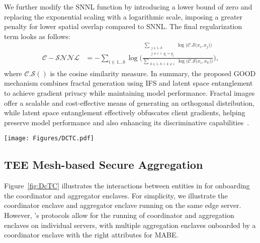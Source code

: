 We further modify the SNNL function by introducing a lower bound of zero and replacing the exponential scaling with a logarithmic scale, imposing a greater penalty for lower spatial overlap compared to SNNL. The final regularization term looks as follows:
\begin{align*}
\mathcal{C-SNNL} &  = -\sum\limits_{i \in 1...b } \log\Biggl( \frac{\sum\limits_{\substack{j \in 1..b \\ j \neq i \, \land \, y_{i} = y_{j}}} \log {\Big(\mathcal{C.S}\big(x_i, x_j\big)\Big)}}{\sum\limits_{\substack{k \in 1..b \, \land \, k \neq i }} \log {\Big(\mathcal{C.S}\big(x_i, x_k\big)\Big)}}\Biggl),
\end{align*}
where $\mathcal{C.S}()$ is the cosine similarity measure.
In summary, the proposed GOOD mechanism combines fractal generation using IFS and latent space entanglement to achieve gradient privacy while maintaining model performance. Fractal images offer a scalable and cost-effective means of generating an orthogonal distribution, while latent space entanglement effectively obfuscates client gradients, helping preserve model performance and also enhancing its discriminative capabilities~\cite{FroPapHin19}.





\begin{figure*}[!ht]
\centering
  \texttt{[image: Figures/DCTC.pdf]} 
  \vspace{-0.1in}
  \caption{The sequence diagram of \sysname outlines the communication flow between the Service Provider, Server, and Client. Detailed interactions and credential establishment processes are presented in Subsections~\ref{subsec05-01} and~\ref{subsec05-02} (Protocols 1–5).}
  \label{fig:DcTC} 
  \vspace{-0.0in}
\end{figure*}


\subsection{TEE Mesh-based Secure Aggregation}
\label{subsec05-01}
Figure~\ref{fig:DcTC} illustrates the interactions between entities in \sysname for onboarding the coordinator and aggregator enclaves.
For simplicity, we illustrate the coordinator enclave and aggregator enclave running on the same edge server. However, \sysname's protocols allow for the running of coordinator and aggregation enclaves on individual servers, with multiple aggregation enclaves onboarded by a coordinator enclave with the right attributes for MABE.
\bigskip

